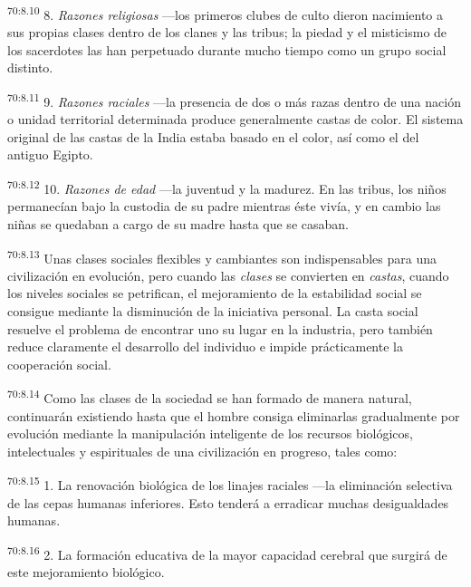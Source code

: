 \par
\textsuperscript{70:8.10} 8. \textit{Razones religiosas} ---los primeros clubes de culto dieron nacimiento a sus propias clases dentro de los clanes y las tribus; la piedad y el misticismo de los sacerdotes las han perpetuado durante mucho tiempo como un grupo social distinto.

\par
\textsuperscript{70:8.11} 9. \textit{Razones raciales} ---la presencia de dos o más razas dentro de una nación o unidad territorial determinada produce generalmente castas de color. El sistema original de las castas de la India estaba basado en el color, así como el del antiguo Egipto.

\par
\textsuperscript{70:8.12} 10. \textit{Razones de edad} ---la juventud y la madurez. En las tribus, los niños permanecían bajo la custodia de su padre mientras éste vivía, y en cambio las niñas se quedaban a cargo de su madre hasta que se casaban.

\par
\textsuperscript{70:8.13} Unas clases sociales flexibles y cambiantes son indispensables para una civilización en evolución, pero cuando las \textit{clases} se convierten en \textit{castas}, cuando los niveles sociales se petrifican, el mejoramiento de la estabilidad social se consigue mediante la disminución de la iniciativa personal. La casta social resuelve el problema de encontrar uno su lugar en la industria, pero también reduce claramente el desarrollo del individuo e impide prácticamente la cooperación social.

\par
\textsuperscript{70:8.14} Como las clases de la sociedad se han formado de manera natural, continuarán existiendo hasta que el hombre consiga eliminarlas gradualmente por evolución mediante la manipulación inteligente de los recursos biológicos, intelectuales y espirituales de una civilización en progreso, tales como:

\par
\textsuperscript{70:8.15} 1. La renovación biológica de los linajes raciales ---la eliminación selectiva de las cepas humanas inferiores. Esto tenderá a erradicar muchas desigualdades humanas.

\par
\textsuperscript{70:8.16} 2. La formación educativa de la mayor capacidad cerebral que surgirá de este mejoramiento biológico.

